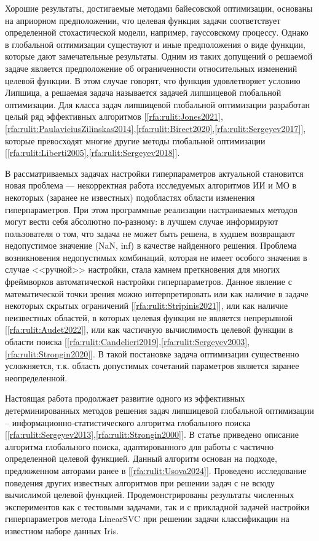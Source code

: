 \documentclass[a4paper,12pt,russian]{article}
\begin{document}
Хорошие результаты, достигаемые методами байесовской оптимизации, основаны на априорном предположении, что целевая функция задачи соответствует определенной стохастической модели, например, гауссовскому процессу. Однако в глобальной оптимизации существуют и иные предположения о виде функции, которые дают замечательные результаты.
Одним  из таких  допущений о решаемой  задаче является предположение об ограниченности относительных изменений целевой функции. В этом случае говорят, что функция удовлетворяет условию Липшица, а решаемая задача называется задачей липшицевой глобальной оптимизации. Для класса задач липшицевой глобальной оптимизации разработан целый ряд эффективных алгоритмов [\ref{rfa:rulit:Jones2021},\ref{rfa:rulit:PaulaviciusZilinskas2014},\ref{rfa:rulit:Birect2020},\ref{rfa:rulit:Sergeyev2017}], которые превосходят многие другие методы глобальной оптимизации [\ref{rfa:rulit:Liberti2005},\ref{rfa:rulit:Sergeyev2018}].

В рассматриваемых задачах настройки гиперпараметров актуальной становится новая проблема --- некорректная работа исследуемых алгоритмов ИИ и МО в некоторых (заранее не известных) подобластях области изменения гиперпараметров. 
При этом программные реализации настраиваемых методов могут вести себя абсолютно по-разному: в лучшем случае информируют пользователя о том, что задача не может быть решена, в худшем возвращают недопустимое значение (NaN, inf) в качестве найденного решения. Проблема возникновения недопустимых комбинаций, которая не имеет особого значения в случае <<ручной>> настройки, стала камнем преткновения для многих фреймворков автоматической настройки гиперпараметров.
Данное явление с математической точки зрения можно интерпретировать или как наличие в задаче некоторых скрытых ограничений [\ref{rfa:rulit:Stripinis2021}], или как наличие неизвестных областей, в которых целевая функция не является непрерывной [\ref{rfa:rulit:Audet2022}], или как частичную вычислимость целевой функции в области поиска [\ref{rfa:rulit:Candelieri2019},\ref{rfa:rulit:Sergeyev2003},\ref{rfa:rulit:Strongin2020}]. В такой постановке задача оптимизации существенно усложняется, т.к. область допустимых сочетаний параметров является заранее неопределенной.


Настоящая работа продолжает развитие одного из эффективных детерминированных методов решения задач липшицевой глобальной оптимизации -- ин\-фор\-ма\-ци\-он\-но-ста\-тис\-ти\-чес\-ко\-го алгоритма глобального поиска [\ref{rfa:rulit:Sergeyev2013},\ref{rfa:rulit:Strongin2000}]. В статье приведено описание алгоритма глобального поиска, адаптированного для работы с частично определенной целевой функцией. Данный алгоритм основан на подходе, предложенном авторами ранее в [\ref{rfa:rulit:Usova2024}]. Проведено исследование поведения других известных алгоритмов при решении задач с не всюду вычислимой целевой функцией. Продемонстрированы результаты численных экспериментов как с тестовыми задачами, так и с прикладной задачей настройки гиперпараметров метода LinearSVC при решении задачи классификации на известном наборе данных Iris.
\end{document}
